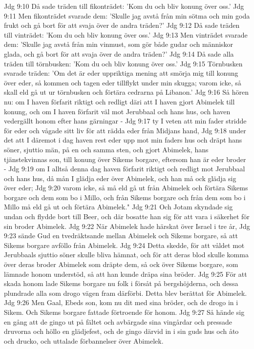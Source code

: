 Jdg 9:10  Då sade träden till fikonträdet: 'Kom du och bliv konung över oss.'
Jdg 9:11  Men fikonträdet svarade dem: 'Skulle jag avstå från min sötma och min goda frukt och gå bort för att svaja över de andra träden?'
Jdg 9:12  Då sade träden till vinträdet: 'Kom du och bliv konung över oss.'
Jdg 9:13  Men vinträdet svarade dem: 'Skulle jag avstå från min vinmust, som gör både gudar och människor glada, och gå bort för att svaja över de andra träden?'
Jdg 9:14  Då sade alla träden till törnbusken: 'Kom du och bliv konung över oss.'
Jdg 9:15  Törnbusken svarade träden: 'Om det är eder uppriktiga mening att smörja mig till konung över eder, så kommen och tagen eder tillflykt under min skugga; varom icke, så skall eld gå ut ur törnbusken och förtära cedrarna på Libanon.'
Jdg 9:16  Så hören nu: om I haven förfarit riktigt och redligt däri att I haven gjort Abimelek till konung, och om I haven förfarit väl mot Jerubbaal och hans hus, och haven vedergällt honom efter hans gärningar -
Jdg 9:17  ty I veten att min fader stridde för eder och vågade sitt liv för att rädda eder från Midjans hand,
Jdg 9:18  under det att I däremot i dag haven rest eder upp mot min faders hus och dräpt hans söner, sjuttio män, på en och samma sten, och gjort Abimelek, hans tjänstekvinnas son, till konung över Sikems borgare, eftersom han är eder broder -
Jdg 9:19  om I alltså denna dag haven förfarit riktigt och redligt mot Jerubbaal och hans hus, då mån I glädja eder över Abimelek, och han må ock glädja sig över eder;
Jdg 9:20  varom icke, så må eld gå ut från Abimelek och förtära Sikems borgare och dem som bo i Millo, och från Sikems borgare och från dem som bo i Millo må eld gå ut och förtära Abimelek."
Jdg 9:21  Och Jotam skyndade sig undan och flydde bort till Beer, och där bosatte han sig för att vara i säkerhet för sin broder Abimelek.
Jdg 9:22  När Abimelek hade härskat över Israel i tre år,
Jdg 9:23  sände Gud en tvedräktsande mellan Abimelek och Sikems borgare, så att Sikems borgare avföllo från Abimelek.
Jdg 9:24  Detta skedde, för att våldet mot Jerubbaals sjuttio söner skulle bliva hämnat, och för att deras blod skulle komma över deras broder Abimelek som dräpte dem, så ock över Sikems borgare, som lämnade honom understöd, så att han kunde dräpa sina bröder.
Jdg 9:25  För att skada honom lade Sikems borgare nu folk i försåt på bergshöjderna, och dessa plundrade alla som drogo vägen fram därförbi. Detta blev berättat för Abimelek.
Jdg 9:26  Men Gaal, Ebeds son, kom nu dit med sina bröder, och de drogo in i Sikem. Och Sikems borgare fattade förtroende för honom.
Jdg 9:27  Så hände sig en gång att de gingo ut på fältet och avbärgade sina vingårdar och pressade druvorna och höllo en glädjefest, och de gingo därvid in i sin guds hus och åto och drucko, och uttalade förbannelser över Abimelek.
